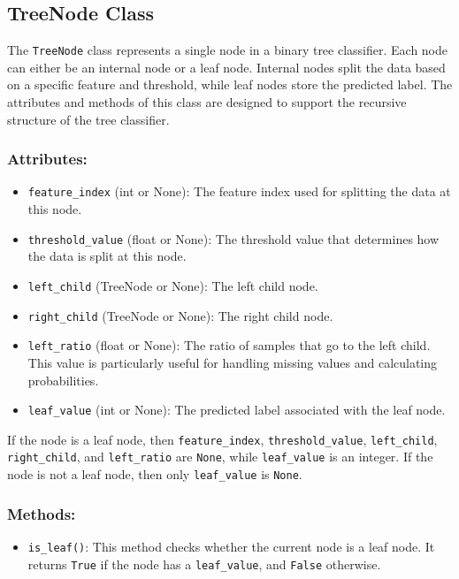 \documentclass{article}
\begin{document}
\subsection{TreeNode Class}

The \texttt{TreeNode} class represents a single node in a binary tree classifier. Each node can either be an internal node or a leaf node. Internal nodes split the data based on a specific feature and threshold, while leaf nodes store the predicted label. The attributes and methods of this class are designed to support the recursive structure of the tree classifier.

\subsubsection*{Attributes:}
\begin{itemize}
    \item \texttt{feature\_index} (int or None): The feature index used for splitting the data at this node.
    \item \texttt{threshold\_value} (float or None): The threshold value that determines how the data is split at this node.
    \item \texttt{left\_child} (TreeNode or None): The left child node.
    \item \texttt{right\_child} (TreeNode or None): The right child node.
    \item \texttt{left\_ratio} (float or None): The ratio of samples that go to the left child. This value is particularly useful for handling missing values and calculating probabilities.
    \item \texttt{leaf\_value} (int or None): The predicted label associated with the leaf node.
\end{itemize}

\noindent If the node is a leaf node, then \texttt{feature\_index}, \texttt{threshold\_value}, \texttt{left\_child}, \texttt{right\_child}, and \texttt{left\_ratio} are \texttt{None}, while \texttt{leaf\_value} is an integer. If the node is not a leaf node, then only \texttt{leaf\_value} is \texttt{None}.

\subsubsection*{Methods:}
\begin{itemize}
    \item \texttt{is\_leaf()}: This method checks whether the current node is a leaf node. It returns \texttt{True} if the node has a \texttt{leaf\_value}, and \texttt{False} otherwise.
\end{itemize}
\end{document}
